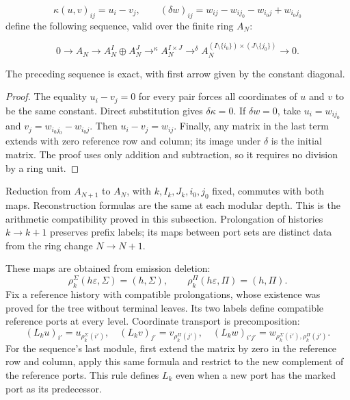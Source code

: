 \[
\kappa(u,v)_{ij}=u_i-v_j,
\qquad
(\delta w)_{ij}=w_{ij}-w_{ij_0}-w_{i_0j}+w_{i_0j_0}
\]
define the following sequence, valid over the finite ring \(A_N\):

\[
0\longrightarrow A_N\longrightarrow
A_N^I\oplus A_N^J\mathrel{\mathop{\longrightarrow}^{\kappa}}
A_N^{I\times J}\mathrel{\mathop{\longrightarrow}^{\delta}}
A_N^{(I\setminus\{i_0\})\times(J\setminus\{j_0\})}
\longrightarrow0.
\]
\begin{proposition}
\label{iv:cont:rectangular-exacta}
The preceding sequence is exact, with first arrow given by the constant diagonal.

\end{proposition}
\begin{proof}
The equality \(u_i-v_j=0\) for every pair forces all coordinates of \(u\) and \(v\) to be the same constant. Direct substitution gives \(\delta\kappa=0\). If \(\delta w=0\), take \(u_i=w_{ij_0}\) and \(v_j=w_{i_0j_0}-w_{i_0j}\). Then \(u_i-v_j=w_{ij}\). Finally, any matrix in the last term extends with zero reference row and column; its image under \(\delta\) is the initial matrix. The proof uses only addition and subtraction, so it requires no division by a ring unit.
\end{proof}

Reduction from \(A_{N+1}\) to \(A_N\), with \(k,I_k,J_k,i_0,j_0\) fixed, commutes with both maps. Reconstruction formulas are the same at each modular depth. This is the arithmetic compatibility proved in this subsection. Prolongation of histories \(k\to k+1\) preserves prefix labels; its maps between port sets are distinct data from the ring change \(N\to N+1\).

These maps are obtained from emission deletion:
\[
\rho_k^\Sigma(h\varepsilon,\Sigma)=(h,\Sigma),\qquad
\rho_k^\Pi(h\varepsilon,\Pi)=(h,\Pi).
\]
Fix a reference history with compatible prolongations, whose existence was proved for the tree without terminal leaves. Its two labels define compatible reference ports at every level. Coordinate transport is precomposition:
\[
(L_ku)_{i'}=u_{\rho_k^\Sigma(i')},\quad
(L_kv)_{j'}=v_{\rho_k^\Pi(j')},\quad
(L_kw)_{i'j'}=w_{\rho_k^\Sigma(i'),\rho_k^\Pi(j')}.
\]
For the sequence's last module, first extend the matrix by zero in the reference row and column, apply this same formula and restrict to the new complement of the reference ports. This rule defines \(L_k\) even when a new port has the marked port as its predecessor.


